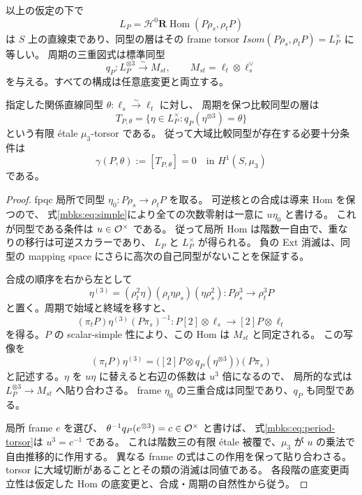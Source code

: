 \begin{proposition}[比較直線と関係直線の三乗則]
\label{mbks:prop:comparison-line}
以上の仮定の下で
\[
 L_P=\mathcal H^0\mathbf R\operatorname{Hom}(P\rho_s,\rho_tP)
\]
は $S$ 上の直線束であり、同型の層はその frame torsor
$\mathit{Isom}(P\rho_s,\rho_tP)=L_P^\times$ に等しい。
周期の三重図式は標準同型
\begin{equation}\label{mbks:eq:cubic-line}
 q_P:L_P^{\otimes3}\xrightarrow{\sim}
 M_{st},\qquad M_{st}=\ell_t\otimes\ell_s^\vee
\end{equation}
を与える。すべての構成は任意底変更と両立する。

指定した関係直線同型 $\theta:\ell_s\xrightarrow{\sim}\ell_t$ に対し、
周期を保つ比較同型の層は
\begin{equation}\label{mbks:eq:period-torsor}
 T_{P,\theta}
 =\{\eta\in L_P^\times:q_P(\eta^{\otimes3})=\theta\}
\end{equation}
という有限 \'etale $\mu_3$-torsor である。
従って大域比較同型が存在する必要十分条件は
\begin{equation}\label{mbks:eq:kummer-class}
 \gamma(P,\theta):=[T_{P,\theta}]=0
       \quad\text{in }H^1(S,\mu_3)
\end{equation}
である。
\end{proposition}
\begin{proof}
fpqc 局所で同型 $\eta_0:P\rho_s\to\rho_tP$ を取る。
可逆核との合成は導来 Hom を保つので、
式\eqref{mbks:eq:simple}により全ての次数零射は一意に $u\eta_0$ と書ける。
これが同型である条件は $u\in\mathcal O^\times$ である。
従って局所 Hom は階数一自由で、重なりの移行は可逆スカラーであり、
$L_P$ と $L_P^\times$ が得られる。
負の Ext 消滅は、同型の mapping space にさらに高次の自己同型がないことを保証する。

合成の順序を右から左として
\[
 \eta^{(3)}
  =(\rho_t^2\eta)(\rho_t\eta\rho_s)(\eta\rho_s^2)
  :P\rho_s^3\longrightarrow\rho_t^3P
\]
と置く。周期で始域と終域を移すと、
\[
 (\pi_tP)\eta^{(3)}(P\pi_s)^{-1}
 :P[2]\otimes\ell_s\longrightarrow [2]P\otimes\ell_t
\]
を得る。$P$ の scalar-simple 性により、この Hom は $M_{st}$ と同定される。
この写像を
\begin{equation}\label{mbks:eq:cubic-convention}
 (\pi_tP)\eta^{(3)}
   =\bigl([2]P\otimes q_P(\eta^{\otimes3})\bigr)(P\pi_s)
\end{equation}
と記述する。$\eta$ を $u\eta$ に替えると右辺の係数は $u^3$ 倍になるので、
局所的な式は $L_P^{\otimes3}\to M_{st}$ へ貼り合わさる。
frame $\eta_0$ の三重合成は同型であり、$q_P$ も同型である。

局所 frame $e$ を選び、
$\theta^{-1}q_P(e^{\otimes3})=c\in\mathcal O^\times$ と書けば、
式\eqref{mbks:eq:period-torsor}は $u^3=c^{-1}$ である。
これは階数三の有限 \'etale 被覆で、$\mu_3$ が $u$ の乗法で自由推移的に作用する。
異なる frame の式はこの作用を保って貼り合わさる。
torsor に大域切断があることとその類の消滅は同値である。
各段階の底変更両立性は仮定した Hom の底変更と、合成・周期の自然性から従う。
\end{proof}

